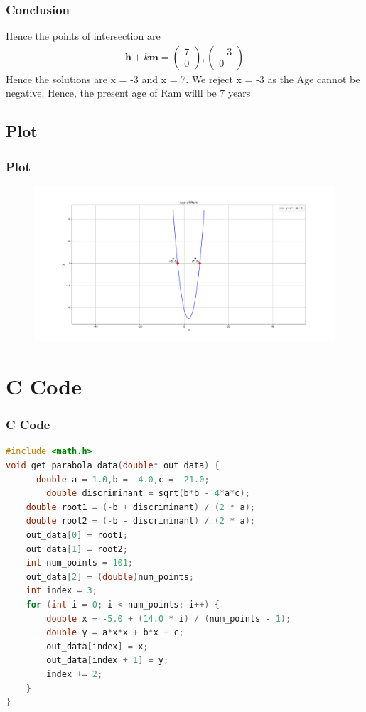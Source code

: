 \documentclass{beamer}
\theoremstyle{remark}
\newcommand{\myvec}[1]{\ensuremath{\begin{pmatrix}#1\end{pmatrix}}}
\let\vec\mathbf
\numberwithin{equation}{section}
\begin{document}
\begin{frame}
\frametitle{Conclusion}
Hence the points of intersection are
\begin{align}
\vec{h}+k\vec{m}=\myvec{7\\0},\myvec{-3\\0}
\end{align}
Hence the solutions are x = -3 and x = 7. We reject
x = -3 as the Age cannot be negative. Hence, the present age of Ram willl be 7 years
\end{frame}
\subsection{Plot}
\begin{frame}[fragile]
\frametitle{Plot}

\begin{figure}[h!]
   \centering
   \includegraphics[width=0.7\columnwidth]{figs/fig1.png}
	\caption{}
   \label{}
\end{figure}
\end{frame}

\section{C Code}
\begin{frame}[fragile]
\frametitle{C Code}
\begin{lstlisting}[language=C]
#include <math.h>
void get_parabola_data(double* out_data) {
      double a = 1.0,b = -4.0,c = -21.0;
        double discriminant = sqrt(b*b - 4*a*c);
    double root1 = (-b + discriminant) / (2 * a);
    double root2 = (-b - discriminant) / (2 * a);
    out_data[0] = root1;
    out_data[1] = root2;
    int num_points = 101;
    out_data[2] = (double)num_points;
    int index = 3;
    for (int i = 0; i < num_points; i++) {
        double x = -5.0 + (14.0 * i) / (num_points - 1);
        double y = a*x*x + b*x + c;
        out_data[index] = x;
        out_data[index + 1] = y;
        index += 2;
    }
}

    \end{lstlisting}
\end{frame}
\end{document}
